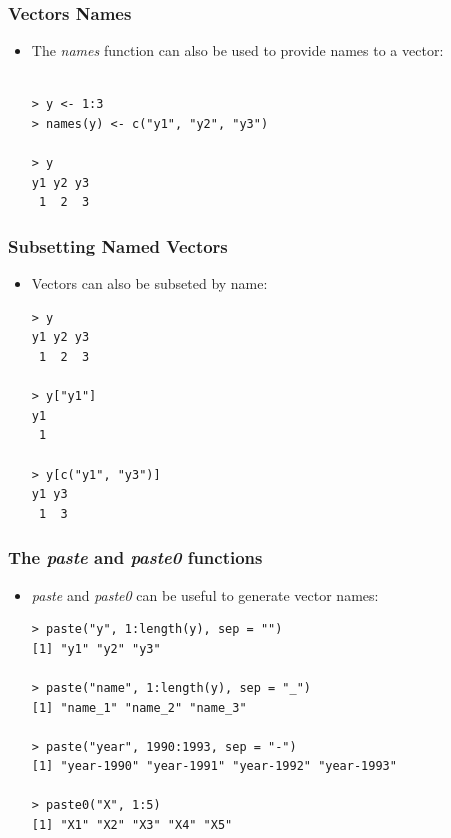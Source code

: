\documentclass[xcolor=dvipsnames, xcolor=table]{beamer} %
\theoremstyle{mystyle}
\begin{document}
\begin{frame}[fragile]
\frametitle{Vectors Names}

\begin{itemize}
\item The \textit{names} function can also be used to provide names to a vector:

\begin{verbatim}

> y <- 1:3
> names(y) <- c("y1", "y2", "y3")

> y
y1 y2 y3 
 1  2  3 

\end{verbatim}
\end{itemize}
\end{frame}

\begin{frame}[fragile]
\frametitle{Subsetting Named Vectors}

\begin{itemize}
\item Vectors can also be subseted by name:

\begin{verbatim}
> y
y1 y2 y3 
 1  2  3 
 
> y["y1"]
y1 
 1 
 
> y[c("y1", "y3")]
y1 y3 
 1  3 
\end{verbatim}
\end{itemize}

\end{frame}


\begin{frame}[fragile]
\frametitle{The \textit{paste} and \textit{paste0} functions}
\begin{itemize}
\item \textit{paste} and \textit{paste0} can be useful to generate vector names:

\begin{verbatim}
> paste("y", 1:length(y), sep = "")
[1] "y1" "y2" "y3"

> paste("name", 1:length(y), sep = "_")
[1] "name_1" "name_2" "name_3"

> paste("year", 1990:1993, sep = "-")
[1] "year-1990" "year-1991" "year-1992" "year-1993"

> paste0("X", 1:5)
[1] "X1" "X2" "X3" "X4" "X5"
\end{verbatim}
\end{itemize}

\end{frame}
\end{document}
